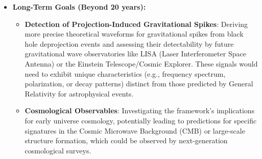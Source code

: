 \documentclass[12pt,a4paper]{article}
\numberwithin{equation}{section}
\begin{document}
\begin{itemize}
    \item \textbf{Long-Term Goals (Beyond 20 years):}
    \begin{itemize}
        \item \textbf{Detection of Projection-Induced Gravitational Spikes}: Deriving more precise theoretical waveforms for gravitational spikes from black hole deprojection events and assessing their detectability by future gravitational wave observatories like LISA (Laser Interferometer Space Antenna) or the Einstein Telescope/Cosmic Explorer. These signals would need to exhibit unique characteristics (e.g., frequency spectrum, polarization, or decay patterns) distinct from those predicted by General Relativity for astrophysical events.
        \item \textbf{Cosmological Observables}: Investigating the framework's implications for early universe cosmology, potentially leading to predictions for specific signatures in the Cosmic Microwave Background (CMB) or large-scale structure formation, which could be observed by next-generation cosmological surveys.
    \end{itemize}
\end{itemize}
\end{document}
